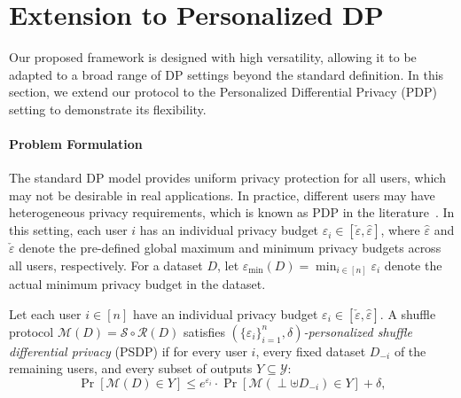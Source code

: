 

\section{Extension to Personalized DP}











Our proposed framework is designed with high versatility, allowing it to be adapted to a broad range of DP settings beyond the standard definition. In this section, we extend our protocol to the Personalized Differential Privacy (PDP) setting to demonstrate its flexibility.



\paragraph{Problem Formulation}
The standard DP model provides uniform privacy protection for all users, which may not be desirable in real applications. In practice, different users may have heterogeneous privacy requirements, which is known as PDP in the literature~\cite{alaggan2015heterogeneous,ebadi2015differential,jorgensen2015conservative,sun2024personalized}.
In this setting, each user $i$ has an individual privacy budget $\varepsilon_i \in [\check{\varepsilon}, \hat{\varepsilon}]$, where $\hat{\varepsilon}$ and $\check{\varepsilon}$ denote the pre-defined global maximum and minimum privacy budgets across all users, respectively. 
For a dataset $D$, let \( \varepsilon_{\min}(D) = \min_{i \in [n]} \varepsilon_i \) denote the actual minimum privacy budget in the dataset. 




\begin{definition} \label{def: PSDP} Let each user $i \in [n]$ have an individual privacy budget $\varepsilon_i \in [\check{\varepsilon}, \hat{\varepsilon}]$. A shuffle protocol $\mathcal{M}(D) = \mathcal{S} \circ \mathcal{R}(D)$ satisfies \emph{$(\{\varepsilon_i\}_{i=1}^n, \delta)$-personalized shuffle differential privacy} (PSDP) if for every user $i$, every fixed dataset $D_{-i}$ of the remaining users, and every subset of outputs $Y \subseteq \mathcal{Y}$: \[ \Pr[\mathcal{M}(D) \in Y] \leq e^{\varepsilon_i} \cdot \Pr[\mathcal{M}(\perp \uplus  D_{-i}) \in Y] + \delta, \] 
\end{definition}


